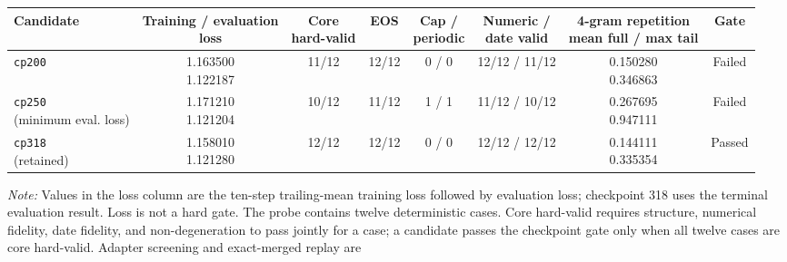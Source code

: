 \begin{table}[htbp]
    \centering
    \scriptsize
    \setlength{\tabcolsep}{3pt}
    \renewcommand{\arraystretch}{1.15}
    \begin{tabular}{@{}lccccccc@{}}
        \toprule
        \textbf{Candidate} &
        \makecell{\textbf{Training / evaluation}\\\textbf{loss}} &
        \makecell{\textbf{Core}\\\textbf{hard-valid}} &
        \textbf{EOS} &
        \makecell{\textbf{Cap /}\\\textbf{periodic}} &
        \makecell{\textbf{Numeric /}\\\textbf{date valid}} &
        \makecell{\textbf{4-gram repetition}\\\textbf{mean full / max tail}} &
        \textbf{Gate} \\
        \midrule
        \texttt{cp200} & \makecell{1.163500 \\ 1.122187} & 11/12 & 12/12 & 0 / 0 & 12/12 / 11/12 & \makecell{0.150280 \\ 0.346863} & Failed \\
        \makecell[l]{\texttt{cp250} \\(minimum eval. loss)} & \makecell{1.171210 \\ 1.121204} & 10/12 & 11/12 & 1 / 1 & 11/12 / 10/12 & \makecell{0.267695 \\ 0.947111} & Failed \\
        \makecell[l]{\texttt{cp318} \\(retained)} & \makecell{1.158010 \\ 1.121280} & 12/12 & 12/12 & 0 / 0 & 12/12 / 12/12 & \makecell{0.144111 \\ 0.335354} & Passed \\
        \bottomrule
    \end{tabular}
    \begin{minipage}{0.97\textwidth}
        \vspace{2pt}
        \footnotesize
        \textit{Note:} Values in the loss column are the ten-step trailing-mean
        training loss followed by evaluation loss; checkpoint 318 uses the
        terminal evaluation result. Loss is not a hard gate. The probe contains
        twelve deterministic cases. Core hard-valid requires structure,
        numerical fidelity, date fidelity, and non-degeneration to pass jointly
        for a case; a candidate passes the checkpoint gate only when all twelve
        cases are core hard-valid. Adapter screening and exact-merged replay are

\end{minipage}
\end{table}
